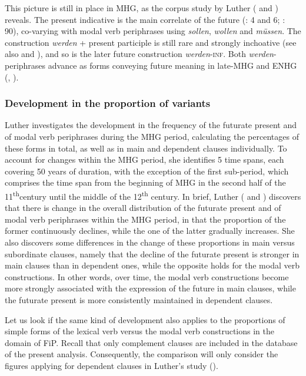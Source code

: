\documentclass[output=paper,colorlinks,citecolor=brown]{langscibook}
\begin{document}
This picture is still in place in MHG, as the corpus study by Luther (\citeyear{Luther2012} and \citeyear{Luther2013}) reveals. The present indicative is the main correlate of the future (\cite{Luther2012}: 4 and 6; \cite{Luther2013}: 90), co-varying with modal verb periphrases using \textit{sollen}, \textit{wollen} and \textit{müssen}. The construction \textit{werden} + present participle is still rare and strongly inchoative (see also \cite[173]{Wilmanns1906}  and \cite[72]{Paul1968}), and so is the later future construction \textit{werden}-\textsc{inf}. Both \textit{werden}-periphrases advance as forms conveying future meaning in late-MHG and ENHG (\cite[5]{Luther2012}, \cite{Hartmann2021}).




\subsubsection{Development in the proportion of variants} \label{section 4.2.2}

Luther investigates the development in the frequency of the futurate present and of modal verb periphrases during the MHG period, calculating the percentages of these forms in total, as well as in main and dependent clauses individually. To account for changes within the MHG period, she identifies 5 time spans, each covering 50 years of duration, with the exception of the first sub-period, which comprises the time span from the beginning of MHG in the second half of the 11\textsuperscript{th}century until the middle of the 12\textsuperscript{th} century. In brief, Luther (\citeyear{Luther2012} and \citeyear{Luther2013}) discovers that there is change in the overall distribution of the futurate present and of modal verb periphrases within the MHG period, in that the proportion of the former continuously declines, while the one of the latter gradually increases. She also discovers some differences in the change of these proportions in main versus subordinate clauses, namely that the decline of the futurate present is stronger in main clauses than in dependent ones, while the opposite holds for the modal verb constructions. In other words, over time, the modal verb constructions become more strongly associated with the expression of the future in main clauses, while the futurate present is more consistently maintained in dependent clauses. 

Let us look if the same kind of development also applies to the proportions of simple forms of the lexical verb versus the modal verb constructions in the domain of FiP. Recall that only complement clauses are included in the database of the present analysis. Consequently, the comparison will only consider the figures applying for dependent clauses in Luther's study (\citeyear{Luther2013}). 
\end{document}
